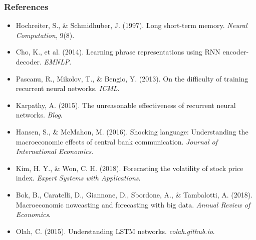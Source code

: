 \documentclass[notes,11pt, aspectratio=169]{beamer}
\begin{document}
\begin{frame}
\frametitle{References}

\footnotesize
\begin{itemize}
    \item Hochreiter, S., \& Schmidhuber, J. (1997). Long short-term memory. \textit{Neural Computation}, 9(8).
    \item Cho, K., et al. (2014). Learning phrase representations using RNN encoder-decoder. \textit{EMNLP}.
    \item Pascanu, R., Mikolov, T., \& Bengio, Y. (2013). On the difficulty of training recurrent neural networks. \textit{ICML}.
    \item Karpathy, A. (2015). The unreasonable effectiveness of recurrent neural networks. \textit{Blog}.
    \item Hansen, S., \& McMahon, M. (2016). Shocking language: Understanding the macroeconomic effects of central bank communication. \textit{Journal of International Economics}.
    \item Kim, H. Y., \& Won, C. H. (2018). Forecasting the volatility of stock price index. \textit{Expert Systems with Applications}.
    \item Bok, B., Caratelli, D., Giannone, D., Sbordone, A., \& Tambalotti, A. (2018). Macroeconomic nowcasting and forecasting with big data. \textit{Annual Review of Economics}.
    \item Olah, C. (2015). Understanding LSTM networks. \textit{colah.github.io}.
\end{itemize}
\end{frame}
\end{document}
